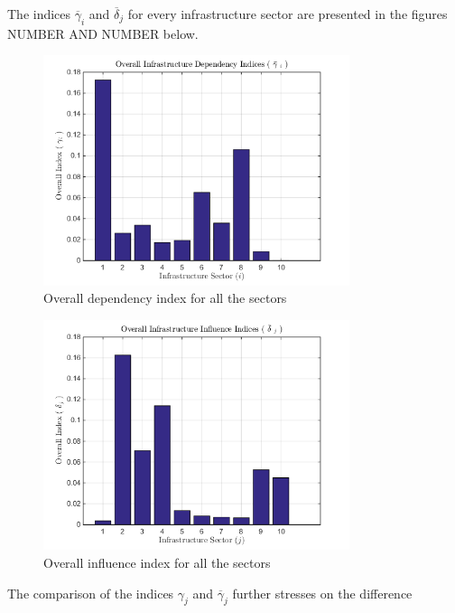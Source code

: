 \documentclass[11pt,a4paper]{article}
\begin{document}
The indices $\overline\gamma_i$ and $\overline\delta_j$ for every infrastructure sector are presented in the figures NUMBER AND NUMBER below.

\begin{figure}
	\centering
	\includegraphics[width=0.8\textwidth]
    {gamma_bar.png}
    \caption{Overall dependency index for all the sectors}
    \label{fig: Gamma bar}
\end{figure}

\begin{figure}
	\centering
	\includegraphics[width=0.8\textwidth]
    {delta_bar.png}
    \caption{Overall influence index for all the sectors}
    \label{fig: Delta bar}
\end{figure}

The comparison of the indices $\gamma_j$ and $\overline\gamma_j$ further stresses on the difference
\end{document}
